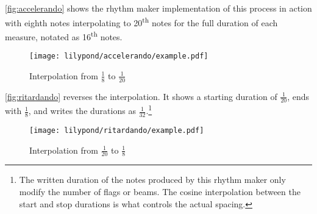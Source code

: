 \autoref{fig:accelerando} shows the rhythm maker implementation of this process in action with eighth notes interpolating to 20\textsuperscript{th} notes for the full duration of each measure, notated as 16\textsuperscript{th} notes.


\begin{figure}[H]
    \texttt{[image: lilypond/accelerando/example.pdf]}
    \caption{Interpolation from $\frac{1}{8}$ to $\frac{1}{20}$}
    \label{fig:accelerando}
\end{figure}

\autoref{fig:ritardando} reverses the interpolation. It shows a starting duration of $\frac{1}{20}$, ends with $\frac{1}{8}$, and writes the durations as $\frac{1}{32}$.\footnote{The written duration of the notes produced by this rhythm maker only modify the number of flags or beams. The cosine interpolation between the start and stop durations is what controls the actual spacing.}


\begin{figure}[H]
    \texttt{[image: lilypond/ritardando/example.pdf]}
    \caption{Interpolation from $\frac{1}{20}$ to $\frac{1}{8}$}
    \label{fig:ritardando}
\end{figure}

